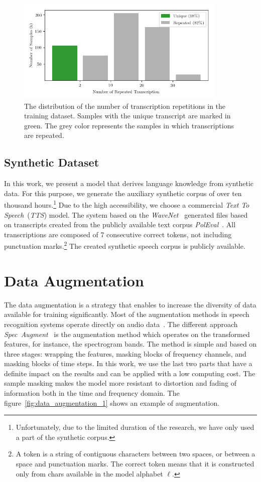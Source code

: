 \begin{figure}[!h]
    \centering
    \includegraphics[width=10cm]{figures/data-repetitions.png}
    \caption{
The distribution of the number of transcription repetitions in the training dataset.
Samples with the unique transcript are marked in green.
The grey color represents the samples in which transcriptions are repeated.
}
    \label{fig:data_repetitions}
\end{figure}


\subsection*{Synthetic Dataset}
In this work, we present a model that derives language knowledge from synthetic data.
For this purpose, we generate the auxiliary synthetic corpus of over ten thousand hours.\footnote{
Unfortunately, due to the limited duration of the research, we have only used a part of the synthetic corpus.
}
Due to the high accessibility, we choose a commercial \textit{Text To Speech}~(\textit{TTS}) model.
The system based on the \textit{WaveNet}~\cite{oord2016} generated files based on transcripts created from the publicly
available text corpus \textit{PolEval}~\cite{ogr:kob:18:poleval}.
All transcriptions are composed of 7 consecutive correct tokens, not including punctuation marks.\footnote{
A token is a string of contiguous characters between two spaces, or between a space and punctuation marks.
The correct token means that it is constructed only from chars available in the model alphabet $\ell$.
}
The created synthetic speech corpus is publicly available.


\section{Data Augmentation}\label{sec:data-augmentation}

The data augmentation is a strategy that enables to increase the diversity of data available for training significantly.
Most of the augmentation methods in speech recognition systems operate directly on audio data~\cite{kanda2013,ragni2014,ko2015}.
The different approach \textit{Spec~Augment}~\cite{park2019} is the augmentation method which operates on the transformed features,
for instance, the spectrogram bands.
The method is simple and based on three stages: wrapping the features, masking blocks of frequency channels,
and masking blocks of time steps.
In this work, we use the last two parts that have a definite impact on the results and can be applied
with a low computing cost.
The sample masking makes the model more resistant to distortion and
fading of information both in the time and frequency domain.
The figure~\ref{fig:data_augmentation_1} shows an example of augmentation.

